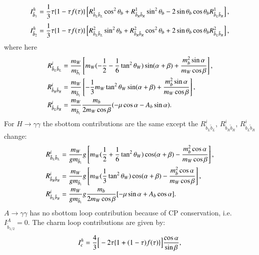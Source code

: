 \documentclass[final,3p,times,pdflatex]{elsarticle}
\begin{document}
\begin{equation}
I_{\tilde{b}_1}^h = {1 \over 3}\tau \{1- \tau f(\tau)\}\left[R_{\tilde{b}_L \tilde{b}_L}^1 \cos^2 \theta_b + R_{\tilde{b}_R \tilde{b}_R}^1 \sin^2 \theta_b - 2\sin\theta_b \cos\theta_b R_{\tilde{b}_L \tilde{b}_R}^1\right],
\end{equation}
\begin{equation}
I_{\tilde{b}_2}^h = {1 \over 3}\tau\{1-\tau f(\tau)\}\left[R_{\tilde{b}_L \tilde{b}_L}^2 \sin^2 \theta_b + R_{\tilde{b}_R \tilde{b}_R}^2 \cos^2 \theta_b + 2\sin\theta_b \cos\theta_b R_{\tilde{b}_L \tilde{b}_R}^2\right],
\end{equation}
where here
\begin{align} 
R_{\tilde{b}_L \tilde{b}_L}^i &= {m_{W} \over m_{\tilde{b}_i}} \left[m_W (-{1 \over 2} - {1 \over 6}\tan^2 \theta_W)\sin(\alpha+\beta) + {m_{b}^2 \sin\alpha \over m_{W} \cos \beta}\right], \\
R_{\tilde{b}_R \tilde{b}_R}^i &= {m_{W} \over m_{\tilde{b}_i}}\left[-{1 \over 3}m_W \tan^2 \theta_W \sin(\alpha + \beta) + {m_{b}^2 \sin\alpha \over m_W \cos\beta}\right], \\
R_{\tilde{b}_L \tilde{b}_R}^i &= {m_W \over m_{\tilde{b}_i}}{m_b \over 2m_W \cos\beta}(-\mu \cos\alpha -A_b \sin\alpha).
\end{align}
For $H \rightarrow \gamma \gamma$ the sbottom contributions are the same except the $R_{\tilde{b}_L \tilde{b}_L}^i$, $R_{\tilde{b}_R \tilde{b}_R}^i$, $R_{\tilde{b}_L \tilde{b}_R}^i$ change:
\begin{align}
R_{\tilde{b}_L \tilde{b}_L}^i &= {m_W \over g m_{\tilde{b}_i}}g\left[m_W ({1 \over 2}+{1\over 6}\tan^2 \theta_W)\cos(\alpha+\beta) - {m_{b}^2 \cos\alpha \over m_W \cos\beta}\right], \\
R_{\tilde{b}_R \tilde{b}_R}^i &= {m_W \over g m_{\tilde{b}_i}}g\left[m_W ({1 \over 3}\tan^2 \theta_W)\cos(\alpha+\beta) - {m_{b}^2 \cos\alpha \over m_W \cos\beta}\right], \\
R_{\tilde{b}_L \tilde{b}_R}^i &= {m_W \over g m_{\tilde{b}_i}}g{m_{b} \over 2m_W \cos\beta}[-\mu \sin \alpha + A_b \cos \alpha].
\end{align}
$A \rightarrow \gamma \gamma$ has no sbottom loop contribution because of CP conservation, i.e. $I_{\tilde{b}_{1/2}}^A = 0$.
The charm loop contributions are given by:
\begin{equation}
I_{c}^h = {4 \over 3}\Big[-2\tau\{1+(1-\tau)f(\tau)\}\Big]{\cos\alpha \over \sin\beta},
\end{equation}
\end{document}
